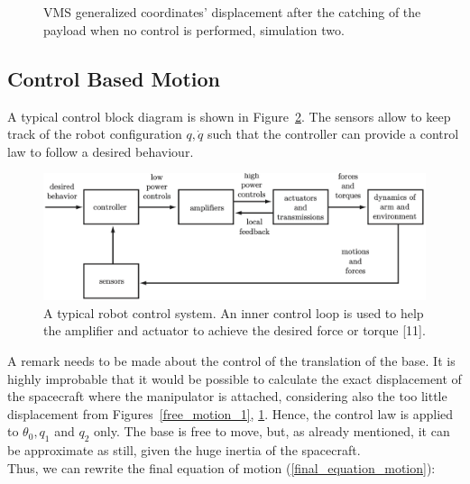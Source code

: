 \documentclass[a4paper,12pt,oneside]{report}
\begin{document}
\begin{figure}[!htb]
  \centering
  \subfloat
  {}\quad
\subfloat
  {} \\
  \subfloat
  {}\quad
  \subfloat
  {}\\
  \subfloat
  {}
  \caption{VMS generalized coordinates' displacement after the catching of the payload when no control is performed, simulation two.}
  \label{free_motion_2}
\end{figure}
\newpage
\FloatBarrier
\subsection{Control Based Motion}\label{control_motion}
A typical control block diagram is shown in Figure~\ref{block_diagram}. The sensors allow to keep track of the robot configuration $q,\dot{q}$ such that the controller can provide a control law to follow a desired behaviour.\\
\begin{figure}[b]
  \centering
  \includegraphics[scale=0.4]{control_diagram.png}
  \caption{A typical robot control system. An inner control loop is used to help the amplifier and actuator to achieve the desired force or torque [11].}
  \label{block_diagram}
\end{figure}
A remark needs to be made about the control of the translation of the base. It is highly improbable that it would be possible to calculate the exact displacement of the spacecraft where the manipulator is attached, considering also the too little displacement from Figures~\ref{free_motion_1}, \ref{free_motion_2}. Hence, the control law is applied to $\theta_0, q_1$ and $q_2$ only. The base is free to move, but, as already mentioned, it can be approximate as still, given the huge inertia of the spacecraft.\\ 
Thus, we can rewrite the final equation of motion (\ref{final_equation_motion}):
\end{document}
